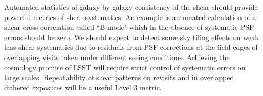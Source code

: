 \documentclass[SE,toc]{lsstdoc}
\begin{document}
Automated statistics of galaxy-by-galaxy consistency of the shear should provide powerful metrics of shear systematics.  An example is automated calculation of a shear cross correlation called ``B-mode" which in the absence of systematic PSF errors should be zero. We should expect to detect some sky tiling effects on weak lens shear systematics due to residuals from PSF corrections at the field edges of overlapping visits taken under different seeing conditions. Achieving the cosmology promise of LSST will require strict control of systematic errors on large scales. Repeatability of shear patterns on revisits and in overlapped dithered exposures will be a useful Level 3 metric.


\end{document}
